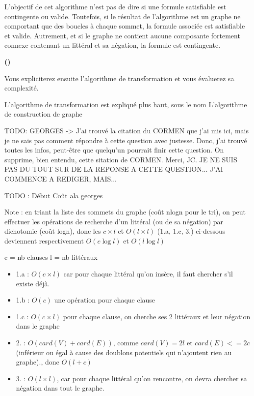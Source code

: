 \documentclass{article}
\newcounter{enoncecount}
\newcounter{sousenoncecount}
\newenvironment{sousenonce}
{
\stepcounter{sousenoncecount}
\bf\small (\alph{sousenoncecount})
\begin{bf}
}
{
\end{bf}
}
\begin{document}
L'objectif de cet algorithme n'est pas de dire si une formule satisfiable est contingente ou valide. Toutefois, si le résultat de
l'algorithme est un graphe ne comportant que des boucles à chaque sommet, la formule associée est satisfiable et valide. Autrement, et si le
graphe ne contient aucune composante fortement connexe contenant un littéral et sa négation, la formule est contingente.



\begin{sousenonce}
Vous expliciterez ensuite l'algorithme de transformation et vous évaluerez sa complexité.
\end{sousenonce}

L'algorithme de transformation est expliqué plus haut, sous le nom \og L'algorithme de construction de graphe\fg{}

TODO: GEORGES -> J'ai trouvé la citation du CORMEN que j'ai mis ici, mais je ne sais pas comment répondre à cette question avec justesse. Donc, j'ai trouvé toutes les infos, peut-être que quelqu'un pourrait finir cette question. On supprime, bien entendu, cette sitation de CORMEN. Merci, JC.
JE NE SUIS PAS DU TOUT SUR DE LA REPONSE A CETTE QUESTION... J'AI COMMENCE A REDIGER, MAIS...

TODO : Début Coût ala georges

Note : en triant la liste des sommets du graphe (coût nlogn pour le tri), on peut effectuer les opérations de recherche d'un littéral (ou de sa négation) par dichotomie (coût logn), donc les $c \times l$ et $O(l \times l)$ (1.a, 1.c, 3.) ci-dessous deviennent respectivement $O(c \log l)$ et $O(l \log l)$

c = nb clauses
l = nb littéraux

\begin{itemize}
\item 1.a : $O(c \times l)$ car pour chaque littéral qu'on insère, il faut chercher s'il existe déjà.
\item 1.b : $O(c)$ une opération pour chaque clause
\item 1.c : $O(c \times l)$ pour chaque clause, on cherche ses 2 littéraux et leur négation dans le graphe
\item 2. : $O(card(V) + card(E))$, comme $card(V) = 2l$ et $card(E) <= 2c$ (inférieur ou égal à cause des doublons potentiels qui n'ajoutent rien au graphe)., donc $O(l+c)$
\item 3. : $O(l \times l)$, car pour chaque littéral qu'on rencontre, on devra chercher sa négation dans tout le graphe.
\end{itemize}
\end{document}
